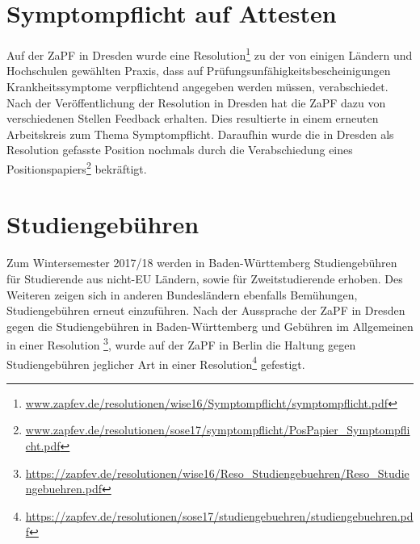 \documentclass[a4paper]{article}
\begin{document}
\section*{Symptompflicht auf Attesten}
Auf der ZaPF in Dresden wurde eine Resolution\footnote{\href{https://zapfev.de/resolutionen/wise16/Symptompflicht/symptompflicht.pdf}{\url{www.zapfev.de/resolutionen/wise16/Symptompflicht/symptompflicht.pdf}}} zu der von einigen Ländern und Hochschulen gewählten Praxis, dass auf Prüfungsunfähigkeitsbescheinigungen Krankheitssymptome verpflichtend angegeben werden müssen, verabschiedet.\\
Nach der Veröffentlichung der Resolution in Dresden hat die ZaPF dazu von verschiedenen Stellen Feedback erhalten. Dies resultierte in einem erneuten Arbeitskreis zum Thema Symptompflicht. Daraufhin wurde die in Dresden als Resolution gefasste Position nochmals durch die Verabschiedung eines Positionspapiers\footnote{\href{https://zapfev.de/resolutionen/sose17/symptompflicht/PosPapier_Symptompflicht.pdf}{\url{www.zapfev.de/resolutionen/sose17/symptompflicht/PosPapier_Symptompflicht.pdf}}} bekräftigt.


\section*{Studiengebühren}
Zum Wintersemester 2017/18 werden in Baden-Württemberg Studiengebühren für Studierende aus nicht-EU Ländern, sowie für Zweitstudierende erhoben. Des Weiteren zeigen sich in anderen Bundesländern ebenfalls Bemühungen, Studiengebühren erneut einzuführen.
Nach der Aussprache der ZaPF in Dresden gegen die Studiengebühren in Baden-Württemberg und Gebühren im Allgemeinen in einer Resolution \footnote{\href{https://zapfev.de/resolutionen/wise16/Reso_Studiengebuehren/Reso_Studiengebuehren.pdf}{\url{https://zapfev.de/resolutionen/wise16/Reso_Studiengebuehren/Reso_Studiengebuehren.pdf}}}, wurde auf der ZaPF in Berlin die Haltung gegen Studiengebühren jeglicher Art in einer Resolution\footnote{\href{https://zapfev.de/resolutionen/sose17/studiengebuehren/studiengebuehren.pdf}{\url{https://zapfev.de/resolutionen/sose17/studiengebuehren/studiengebuehren.pdf}}} gefestigt.

        
\end{document}

